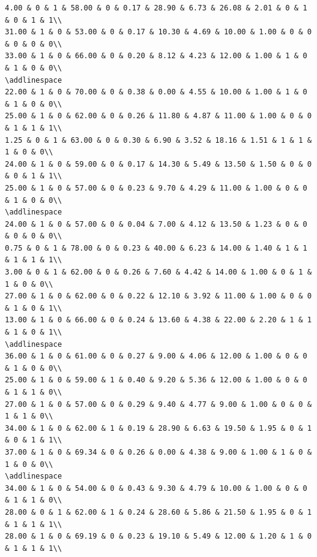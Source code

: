 \documentclass[
]{article}
\begin{document}
\begin{verbatim}
4.00 & 0 & 1 & 58.00 & 0 & 0.17 & 28.90 & 6.73 & 26.08 & 2.01 & 0 & 1 & 0 & 1 & 1\\
31.00 & 1 & 0 & 53.00 & 0 & 0.17 & 10.30 & 4.69 & 10.00 & 1.00 & 0 & 0 & 0 & 0 & 0\\
33.00 & 1 & 0 & 66.00 & 0 & 0.20 & 8.12 & 4.23 & 12.00 & 1.00 & 1 & 0 & 1 & 0 & 0\\
\addlinespace
22.00 & 1 & 0 & 70.00 & 0 & 0.38 & 0.00 & 4.55 & 10.00 & 1.00 & 1 & 0 & 1 & 0 & 0\\
25.00 & 1 & 0 & 62.00 & 0 & 0.26 & 11.80 & 4.87 & 11.00 & 1.00 & 0 & 0 & 1 & 1 & 1\\
1.25 & 0 & 1 & 63.00 & 0 & 0.30 & 6.90 & 3.52 & 18.16 & 1.51 & 1 & 1 & 1 & 0 & 0\\
24.00 & 1 & 0 & 59.00 & 0 & 0.17 & 14.30 & 5.49 & 13.50 & 1.50 & 0 & 0 & 0 & 1 & 1\\
25.00 & 1 & 0 & 57.00 & 0 & 0.23 & 9.70 & 4.29 & 11.00 & 1.00 & 0 & 0 & 1 & 0 & 0\\
\addlinespace
24.00 & 1 & 0 & 57.00 & 0 & 0.04 & 7.00 & 4.12 & 13.50 & 1.23 & 0 & 0 & 0 & 0 & 0\\
0.75 & 0 & 1 & 78.00 & 0 & 0.23 & 40.00 & 6.23 & 14.00 & 1.40 & 1 & 1 & 1 & 1 & 1\\
3.00 & 0 & 1 & 62.00 & 0 & 0.26 & 7.60 & 4.42 & 14.00 & 1.00 & 0 & 1 & 1 & 0 & 0\\
27.00 & 1 & 0 & 62.00 & 0 & 0.22 & 12.10 & 3.92 & 11.00 & 1.00 & 0 & 0 & 1 & 0 & 1\\
13.00 & 1 & 0 & 66.00 & 0 & 0.24 & 13.60 & 4.38 & 22.00 & 2.20 & 1 & 1 & 1 & 0 & 1\\
\addlinespace
36.00 & 1 & 0 & 61.00 & 0 & 0.27 & 9.00 & 4.06 & 12.00 & 1.00 & 0 & 0 & 1 & 0 & 0\\
25.00 & 1 & 0 & 59.00 & 1 & 0.40 & 9.20 & 5.36 & 12.00 & 1.00 & 0 & 0 & 1 & 1 & 0\\
27.00 & 1 & 0 & 57.00 & 0 & 0.29 & 9.40 & 4.77 & 9.00 & 1.00 & 0 & 0 & 1 & 1 & 0\\
34.00 & 1 & 0 & 62.00 & 1 & 0.19 & 28.90 & 6.63 & 19.50 & 1.95 & 0 & 1 & 0 & 1 & 1\\
37.00 & 1 & 0 & 69.34 & 0 & 0.26 & 0.00 & 4.38 & 9.00 & 1.00 & 1 & 0 & 1 & 0 & 0\\
\addlinespace
34.00 & 1 & 0 & 54.00 & 0 & 0.43 & 9.30 & 4.79 & 10.00 & 1.00 & 0 & 0 & 1 & 1 & 0\\
28.00 & 0 & 1 & 62.00 & 1 & 0.24 & 28.60 & 5.86 & 21.50 & 1.95 & 0 & 1 & 1 & 1 & 1\\
28.00 & 1 & 0 & 69.19 & 0 & 0.23 & 19.10 & 5.49 & 12.00 & 1.20 & 1 & 0 & 1 & 1 & 1\\

\end{verbatim}
\end{document}
